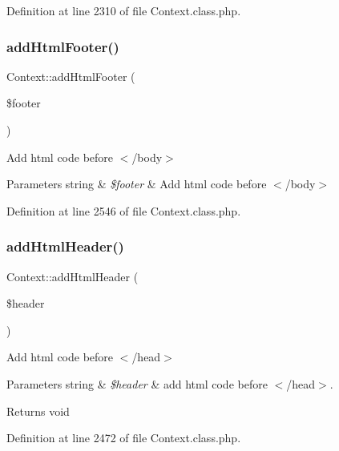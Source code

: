 Definition at line 2310 of file Context.\+class.\+php.

\mbox{\label{classContext_aa81925b1cc7e991c1c798e739fe048a4}} 
\subsubsection{\texorpdfstring{add\+Html\+Footer()}{addHtmlFooter()}}
{\footnotesize\ttfamily Context\+::add\+Html\+Footer (\begin{DoxyParamCaption}\item[{}]{\$footer }\end{DoxyParamCaption})}

Add html code before $<$/body$>$


\begin{DoxyParams}[1]{Parameters}
string & {\em \$footer} & Add html code before $<$/body$>$ \\
\hline
\end{DoxyParams}


Definition at line 2546 of file Context.\+class.\+php.

\mbox{\label{classContext_a26a1aea944ae54bb826500f544a67950}} 
\subsubsection{\texorpdfstring{add\+Html\+Header()}{addHtmlHeader()}}
{\footnotesize\ttfamily Context\+::add\+Html\+Header (\begin{DoxyParamCaption}\item[{}]{\$header }\end{DoxyParamCaption})}

Add html code before $<$/head$>$


\begin{DoxyParams}[1]{Parameters}
string & {\em \$header} & add html code before $<$/head$>$. \\
\hline
\end{DoxyParams}
\begin{DoxyReturn}{Returns}
void 
\end{DoxyReturn}


Definition at line 2472 of file Context.\+class.\+php.

